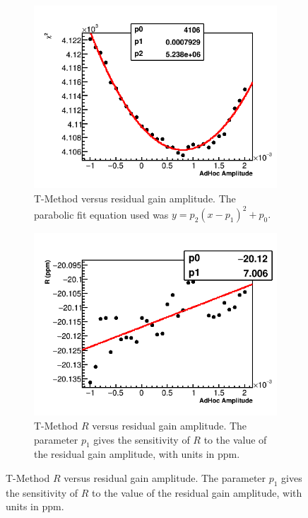 \begin{figure}[h]
\centering
    \begin{subfigure}[t]{0.45\textwidth}
        \centering
        \includegraphics[width=\textwidth]{TMethod_Chi2_Vs_AdHocAmplitude_Canv}
        \caption{T-Method \chisq versus residual gain amplitude. The parabolic fit equation used was $y = p_{2}(x - p_{1})^{2} + p_{0}.$}
    \end{subfigure}%
    \hspace{1cm}
    \begin{subfigure}[t]{0.45\textwidth}
        \centering
        \includegraphics[width=\textwidth]{TMethod_R_Vs_AdHocAmplitude_Canv}
        \caption{T-Method $R$ versus residual gain amplitude. The parameter $p_{1}$ gives the sensitivity of $R$ to the value of the residual gain amplitude, with units in ppm.}
    \end{subfigure}


\end{figure}
